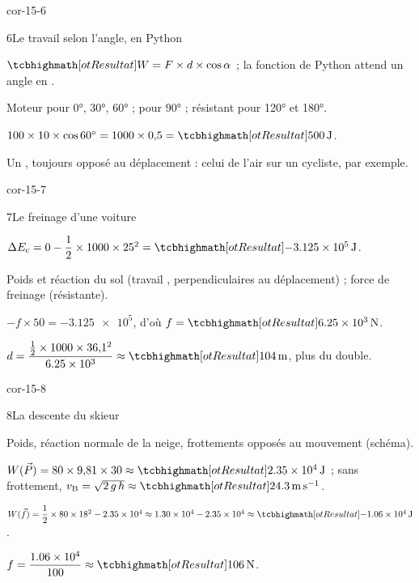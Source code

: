 \begin{blocLivre}{cor-15-6}
\begin{corrige}{6}{Le travail selon l'angle, en Python}
\begin{questions}
\item $\res{W=F\times d\times\cos\alpha}$ ; la fonction  de Python attend un angle en .
\item Moteur pour \ang{0}, \ang{30}, \ang{60} ;  pour \ang{90} ; résistant pour \ang{120} et \ang{180}.
\item $100\times10\times\cos\ang{60}=1000\times0{,}5=\res{\qty{500}{J}}$.
\item Un , toujours opposé au déplacement : celui de l'air sur un cycliste, par exemple.
\end{questions}
\end{corrige}
\end{blocLivre}
\begin{blocLivre}{cor-15-7}
\begin{corrige}{7}{Le freinage d'une voiture}
\begin{questions}
\item $\Delta E_\mathrm{c}=0-\dfrac{1}{2}\times1000\times25^2=\res{\qty{-3,125e5}{J}}$.
\item Poids et réaction du sol (travail , perpendiculaires au déplacement) ; force de freinage (résistante).
\item $-f\times50=\num{-3,125e5}$, d'où $f=\res{\qty{6,25e3}{N}}$.
\item $d=\dfrac{\frac{1}{2}\times1000\times36{,}1^2}{\num{6,25e3}}\approx\res{\qty{104}{m}}$, plus du double.
\end{questions}
\end{corrige}
\end{blocLivre}
\begin{blocLivre}{cor-15-8}
\begin{corrige}{8}{La descente du skieur}
\begin{questions}
\item Poids, réaction normale de la neige, frottements opposés au mouvement (schéma).
\item $W(\vec{P})=80\times9{,}81\times30\approx\res{\qty{2,35e4}{J}}$ ; sans frottement, $v_\mathrm{B}=\sqrt{2\,g\,h}\approx\res{\qty{24,3}{m.s^{-1}}}$.
\item $W(\vec{f})=\dfrac{1}{2}\times80\times18^2-\num{2,35e4}\approx\num{1,30e4}-\num{2,35e4}\approx\res{\qty{-1,06e4}{J}}$.
\item $f=\dfrac{\num{1,06e4}}{100}\approx\res{\qty{106}{N}}$.
\end{questions}
\end{corrige}
\end{blocLivre}

